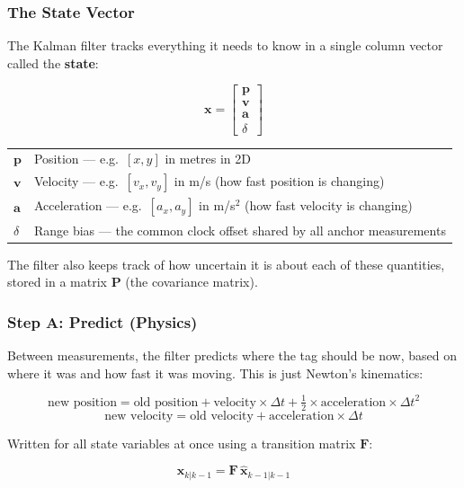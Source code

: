 \documentclass[11pt,a4paper]{article}
\newcommand{\vect}[1]{\bm{#1}}
\newcommand{\mat}[1]{\mathbf{#1}}
\begin{document}
\subsubsection{The State Vector}

The Kalman filter tracks everything it needs to know in a single column vector called the \textbf{state}:

\begin{equation}
\vect{x} = \begin{bmatrix} \vect{p} \\ \vect{v} \\ \vect{a} \\ \delta \end{bmatrix}
\end{equation}

\begin{symbols}
\begin{tabular}{ll}
$\vect{p}$ & Position --- e.g.\ $[x, y]$ in metres in 2D \\
$\vect{v}$ & Velocity --- e.g.\ $[v_x, v_y]$ in m/s (how fast position is changing) \\
$\vect{a}$ & Acceleration --- e.g.\ $[a_x, a_y]$ in m/s$^2$ (how fast velocity is changing) \\
$\delta$ & Range bias --- the common clock offset shared by all anchor measurements \\
\end{tabular}
\end{symbols}

The filter also keeps track of how uncertain it is about each of these quantities, stored in a matrix $\mat{P}$ (the covariance matrix).

\subsubsection{Step A: Predict (Physics)}

Between measurements, the filter predicts where the tag should be now, based on where it was and how fast it was moving. This is just Newton's kinematics:

\[
\text{new position} = \text{old position} + \text{velocity} \times \Delta t + \tfrac{1}{2} \times \text{acceleration} \times \Delta t^2
\]
\[
\text{new velocity} = \text{old velocity} + \text{acceleration} \times \Delta t
\]

Written for all state variables at once using a transition matrix $\mat{F}$:

\begin{equation}
\hat{\vect{x}}_{k|k-1} = \mat{F}\,\hat{\vect{x}}_{k-1|k-1}
\end{equation}
\end{document}
